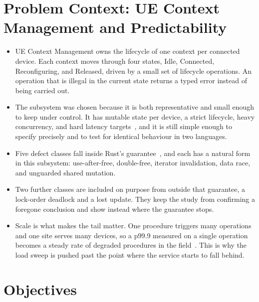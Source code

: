\documentclass[english,twoside,openright,a4paper,censored,csm,software-track-2020]{HYthesisML}
\begin{document}
\chapter{Problem Context: UE Context Management and Predictability\label{chapter:context}}

\begin{itemize}
  \item UE Context Management owns the lifecycle of one context per connected device. Each
        context moves through four states, Idle, Connected, Reconfiguring, and Released, driven
        by a small set of lifecycle operations. An operation that is illegal in the current
        state returns a typed error instead of being carried out.
  \item The subsystem was chosen because it is both representative and small enough to keep
        under control. It has mutable state per device, a strict lifecycle, heavy concurrency,
        and hard latency targets~\cite{3gpp22261}, and it is still simple enough to specify
        precisely and to test for identical behaviour in two languages.
  \item Five defect classes fall inside Rust's guarantee~\cite{jung2021safe}, and each has a
        natural form in this subsystem: use-after-free, double-free, iterator invalidation,
        data race, and unguarded shared mutation.
  \item Two further classes are included on purpose from outside that guarantee, a lock-order
        deadlock and a lost update. They keep the study from confirming a foregone conclusion
        and show instead where the guarantee stops.
  \item Scale is what makes the tail matter. One procedure triggers many operations and one
        site serves many devices, so a p99.9 measured on a single operation becomes a steady
        rate of degraded procedures in the field~\cite{dean2013tail}. This is why the load
        sweep is pushed past the point where the service starts to fall behind.
\end{itemize}

\chapter{Objectives\label{chapter:objectives}}
\end{document}
